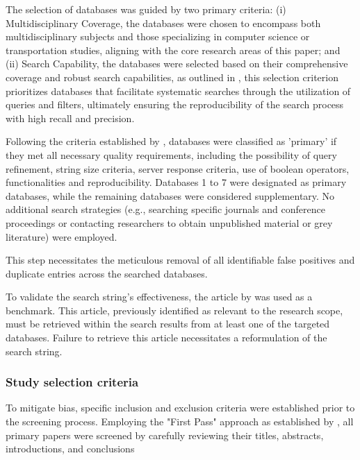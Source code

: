 The selection of databases was guided by two primary criteria: (i)
Multidisciplinary Coverage, the databases were chosen to encompass both
multidisciplinary subjects and those specializing in computer science or
transportation studies, aligning with the core research areas of this paper; and
(ii)  Search Capability, the databases were selected based on their
comprehensive coverage and robust search capabilities, as outlined in
, this selection criterion prioritizes
databases that facilitate systematic searches through the utilization of queries
and filters, ultimately ensuring the reproducibility of the search process with
high recall and precision.
%
 


Following the criteria established by ,
databases were classified as 'primary' if they met all necessary quality
requirements, including the possibility of query refinement, string size
criteria, server response criteria, use of boolean operators, functionalities
and reproducibility.
%
Databases 1 to 7 were designated as primary databases, while the remaining
databases were considered supplementary.
%
No additional search strategies (e.g., searching specific journals and
conference proceedings or contacting researchers to obtain unpublished material
or grey literature) were employed.



This step necessitates the meticulous removal of all identifiable false
positives and duplicate entries across the searched databases.



To validate the search string's effectiveness, the article by
 was used as a benchmark.
%
This article, previously identified as relevant to the research scope, must be
retrieved within the search results from at least one of the targeted databases.
%
Failure to retrieve this article necessitates a reformulation of the search
string.



\subsubsection{Study selection criteria}
To mitigate bias, specific inclusion and exclusion criteria were established
prior to the screening process.
%
Employing the "First Pass" approach as established by
, all primary papers were screened by carefully
reviewing their titles, abstracts, introductions, and conclusions



